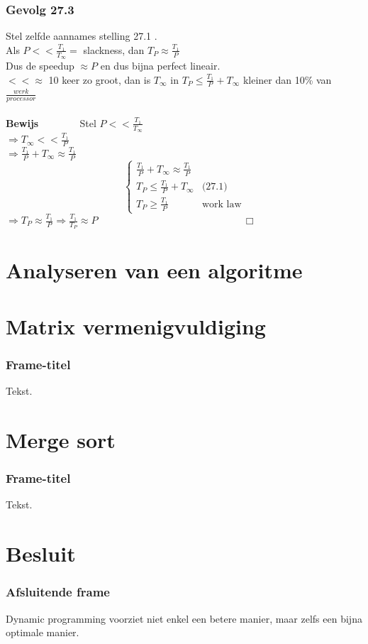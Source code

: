 \documentclass
   [kulak] %
   {kulakbeamer}
\begin{document}
\begin{frame}
	\frametitle{Gevolg 27.3}
	Stel zelfde aannames stelling 27.1 .
	\\ Als $P << \frac{T_1}{T_\infty} =$ slackness, dan $T_P \approx \frac{T_1}{P} $ \\
	Dus de speedup $\approx P$ en dus bijna perfect lineair.\\ $<< \approx$ 10 keer zo groot, dan is $T_\infty$ in $T_P \leqslant \frac{T_1}{P} + T_\infty$ kleiner dan 10\% van $\frac{werk}{processor}$  \pause \\~\\
	\textbf{Bewijs} ~~~~~~~
	Stel $P << \frac{T_1}{T_\infty}$ \\
	$\Rightarrow T_\infty << \frac{T_1}{P} $ \\
	$\Rightarrow \frac{T_1}{P} + T_\infty \approx \frac{T_1}{P} $ \\
	\[
		\begin{cases}
			\frac{T_1}{P} + T_\infty \approx \frac{T_1}{P} & \\
			T_P \leqslant \frac{T_1}{P} + T_\infty & \text{(27.1)}  \\
			T_P \geqslant \frac{T_1}{P} & \text{work law}
		\end{cases}
	\]
	$\Rightarrow T_P \approx \frac{T_1}{P} \Rightarrow \frac{T_1}{T_P}\approx P$ ~~~~~~~~~~~~~~~~~~~~~~~~~~~~ $\Box$
	
\end{frame}

\section[Analyse]{Analyseren van een algoritme}

\section[Matrix]{Matrix vermenigvuldiging}

\begin{frame}
	\frametitle{Frame-titel}
	Tekst.
\end{frame}

\section[Merge sort]{Merge sort}

\begin{frame}
	\frametitle{Frame-titel}
	Tekst.
\end{frame}

\section{Besluit}
\begin{frame}
\frametitle{Afsluitende frame}
Dynamic programming voorziet niet enkel een betere manier, maar zelfs een bijna optimale manier.
\end{frame}
\end{document}
